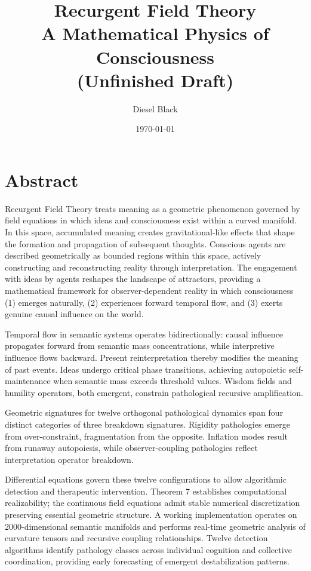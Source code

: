 \documentclass[11pt, a4paper]{report}
\title{Recurgent Field Theory \\ A Mathematical Physics of Consciousness \\ \small{(Unfinished Draft)}}
\author{Diesel Black}
\date{\today}
\begin{document}
\maketitle

\section*{Abstract}
Recurgent Field Theory treats meaning as a geometric phenomenon governed by field equations in which ideas and consciousness exist within a curved manifold. In this space, accumulated meaning creates gravitational-like effects that shape the formation and propagation of subsequent thoughts. Conscious agents are described geometrically as bounded regions within this space, actively constructing and reconstructing reality through interpretation. The engagement with ideas by agents reshapes the landscape of attractors, providing a mathematical framework for observer-dependent reality in which consciousness (1) emerges naturally, (2) experiences forward temporal flow, and (3) exerts genuine causal influence on the world.

Temporal flow in semantic systems operates bidirectionally: causal influence propagates forward from semantic mass concentrations, while interpretive influence flows backward. Present reinterpretation thereby modifies the meaning of past events. Ideas undergo critical phase transitions, achieving autopoietic self-maintenance when semantic mass exceeds threshold values. Wisdom fields and humility operators, both emergent, constrain pathological recursive amplification.

Geometric signatures for twelve orthogonal pathological dynamics span four distinct categories of three breakdown signatures. Rigidity pathologies emerge from over-constraint, fragmentation from the opposite. Inflation modes result from runaway autopoiesis, while observer-coupling pathologies reflect interpretation operator breakdown.

Differential equations govern these twelve configurations to allow algorithmic detection and therapeutic intervention. Theorem 7 establishes computational realizability; the continuous field equations admit stable numerical discretization preserving essential geometric structure. A working implementation operates on 2000-dimensional semantic manifolds and performs real-time geometric analysis of curvature tensors and recursive coupling relationships. Twelve detection algorithms identify pathology classes across individual cognition and collective coordination, providing early forecasting of emergent destabilization patterns.
\end{document}
